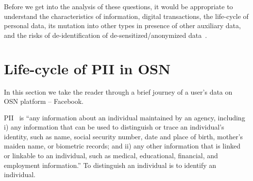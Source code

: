 \documentclass[runningheads]{llncs}
\begin{document}
Before we get into the analysis of these questions, it would be
appropriate to understand the characteristics of information, digital
transactions, the life-cycle of personal data, its mutation into
other types in presence of other auxiliary data, and the risks of
de-identification of de-sensitized/anonymized
data~\cite{paul-ohm-accretive}.

\section{Life-cycle of PII in OSN}
\label{sec:life-cycle}
\noindent In this section we take the reader through a brief journey
of a user's data on OSN platform -- Facebook.

PII~\cite{nist-pii} is ``any information about an individual
maintained by an agency, including i) any information that can be used
to distinguish or trace an individual's identity, such as name, social
security number, date and place of birth, mother's maiden name, or
biometric records; and ii) any other information that is linked or
linkable to an individual, such as medical, educational, financial,
and employment information.'' To distinguish an individual is to
identify an individual.
\end{document}

